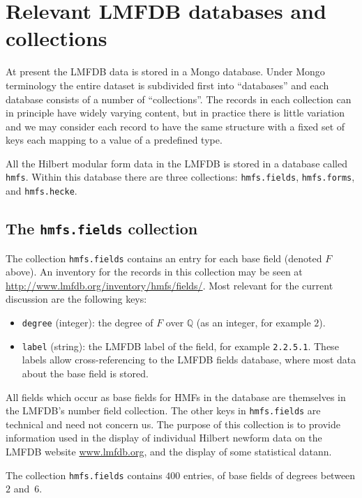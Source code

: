 \documentclass{llncs}
\def\Q{{\mathbb Q}}
\begin{document}
\section{Relevant LMFDB databases and collections}
At present the LMFDB data is stored in a Mongo database.  Under Mongo
terminology the entire dataset is subdivided first into ``databases''
and each database consists of a number of ``collections''.  The
records in each collection can in principle have widely varying
content, but in practice there is little variation and we may consider
each record to have the same structure with a fixed set of keys each
mapping to a value of a predefined type.

All the Hilbert modular form data in the LMFDB is stored in a database
called {\tt hmfs}.  Within this database there are three collections:
{\tt hmfs.fields}, {\tt hmfs.forms}, and {\tt hmfs.hecke}.

\subsection{The {\tt hmfs.fields} collection}
The collection {\tt hmfs.fields} contains an entry for each base field
(denoted $F$ above).  An inventory for the records in this collection
may be seen at \url{http://www.lmfdb.org/inventory/hmfs/fields/}.
Most relevant for the current discussion are the following keys:
\begin{itemize}
\item {\tt degree} (integer): the degree of $F$ over $\Q$ (as an
  integer, for example $2$).
\item {\tt label} (string): the LMFDB label of the field, for example
  {\tt 2.2.5.1}.  These labels allow cross-referencing to the LMFDB
  fields database, where most data about the base field is stored.
\end{itemize}
All fields which occur as base fields for HMFs in the database are
themselves in the LMFDB's number field collection.  The other keys in
{\tt hmfs.fields} are technical and need not concern us.  The purpose
of this collection is to provide information used in the display of
individual Hilbert newform data on the LMFDB website
\url{www.lmfdb.org}, and the display of some statistical datann.

The collection {\tt hmfs.fields} contains $400$ entries, of base
fields of degrees between $2$ and~$6$.
\end{document}
